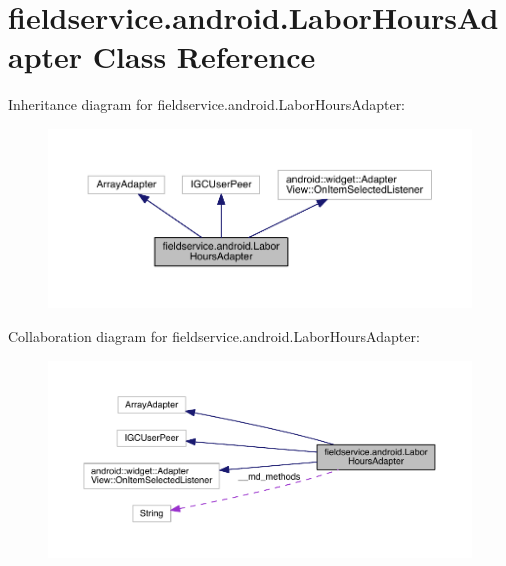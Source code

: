 \hypertarget{classfieldservice_1_1android_1_1_labor_hours_adapter}{\section{fieldservice.\+android.\+Labor\+Hours\+Adapter Class Reference}
\label{classfieldservice_1_1android_1_1_labor_hours_adapter}
}


Inheritance diagram for fieldservice.\+android.\+Labor\+Hours\+Adapter\+:
\nopagebreak
\begin{figure}[H]
\begin{center}
\leavevmode
\includegraphics[width=350pt]{classfieldservice_1_1android_1_1_labor_hours_adapter__inherit__graph}
\end{center}
\end{figure}


Collaboration diagram for fieldservice.\+android.\+Labor\+Hours\+Adapter\+:
\nopagebreak
\begin{figure}[H]
\begin{center}
\leavevmode
\includegraphics[width=350pt]{classfieldservice_1_1android_1_1_labor_hours_adapter__coll__graph}
\end{center}
\end{figure}
